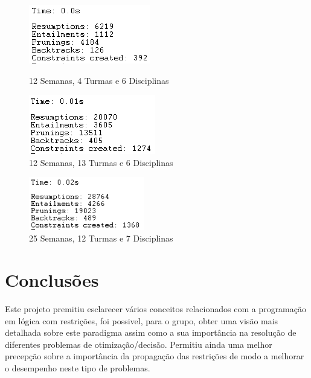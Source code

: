 \documentclass{llncs}
\begin{document}
\begin{figure}
\centering
    \begin{minipage}{0.45\textwidth}
    \centering
    \includegraphics[width=.9\textwidth]{12Semanas_4Turmas_6Disciplinas}
    \caption{12 Semanas, 4 Turmas e 6 Disciplinas}
    \end{minipage}\hfill
    \begin{minipage}{0.45\textwidth}
    \centering
   \includegraphics[width=.9\textwidth]{12Semanas_13Turmas_6Disciplinas}
\caption{12 Semanas, 13 Turmas e 6 Disciplinas}
    \end{minipage}\hfill
\end{figure}
\FloatBarrier

\begin{figure}
\centering
\includegraphics[width=0.45\textwidth]{25Semanas_12Turmas_7Disciplinas}
\caption{25 Semanas, 12 Turmas e 7 Disciplinas}
\label{reference}
\end{figure}
\FloatBarrier
\clearpage

\section{Conclusões}
Este projeto premitiu esclarecer vários conceitos relacionados com a programação em lógica com restrições, foi possivel, para o grupo, obter uma visão mais detalhada sobre este paradigma assim como a sua importância na resolução de diferentes problemas de otimização/decisão. Permitiu ainda uma melhor precepção sobre a importância da propagação das restrições de modo a melhorar o desempenho neste tipo de problemas.
\end{document}

